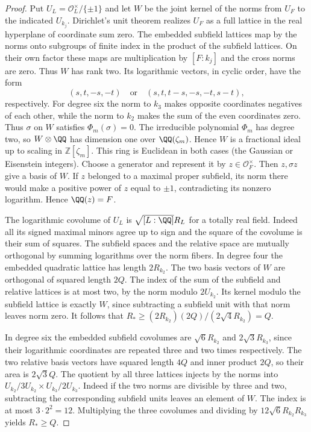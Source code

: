 \documentclass[a4paper,11pt]{article}
\theoremstyle{definition}
\theoremstyle{remark}
\newcommand{\ZZ}{\mathbb Z}\newcommand{\ord}{\operatorname{ord}}
\numberwithin{equation}{section}
\newcommand{\OO}{\mathcal O}
\begin{document}
\begin{proof}
Put \(U_L=\OO_L^\times/\{\pm1\}\) and let \(W\) be the joint
kernel of the norms from \(U_F\) to the indicated \(U_{k_j}\).
Dirichlet's unit theorem realizes \(U_F\) as a full lattice
in the real hyperplane of coordinate sum zero. The embedded
subfield lattices map by the norms onto subgroups of finite
index in the product of the subfield lattices. On their own
factor these maps are multiplication by \([F:k_j]\) and the
cross norms are zero. Thus \(W\) has rank two. Its logarithmic
vectors, in cyclic order, have the form
\[
  (s,t,-s,-t)\quad\text{or}\quad(s,t,t-s,-s,-t,s-t),
\]
respectively. For degree six the norm to \(k_3\) makes opposite
coordinates negatives of each other, while the norm to \(k_2\)
makes the sum of the even coordinates zero. Thus \(\sigma\)
on \(W\) satisfies \(\Phi_m(\sigma)=0\). The irreducible polynomial
\(\Phi_m\) has degree two, so \(W\otimes\QQ\) has dimension one
over \(\QQ(\zeta_m)\). Hence \(W\) is a fractional ideal up to
scaling in \(\ZZ[\zeta_m]\). This ring is Euclidean in both cases
(the Gaussian or Eisenstein integers). Choose a generator and
represent it by \(z\in\OO_F^\times\). Then \(z,\sigma z\) give a
basis of \(W\). If \(z\) belonged to a maximal proper subfield,
its norm there would make a positive power of \(z\) equal to
\(\pm1\), contradicting its nonzero logarithm. Hence \(\QQ(z)=F\).

The logarithmic covolume of \(U_L\) is \(\sqrt{[L:\QQ]}R_L\)
for a totally real field. Indeed all its signed maximal minors
agree up to sign and the square of the covolume is their sum of
squares. The subfield spaces and the relative space are mutually
orthogonal by summing logarithms over the norm fibers. In degree
four the embedded quadratic lattice has length \(2R_{k_2}\).
The two basis vectors of \(W\) are orthogonal of squared length
\(2Q\). The index of the sum of the subfield and relative lattices
is at most two, by the norm modulo \(2U_{k_2}\). Its kernel modulo
the subfield lattice is exactly \(W\), since subtracting a
subfield unit with that norm leaves norm zero. It follows that
\(R_*\ge (2R_{k_2})(2Q)/(2\sqrt4 R_{k_2})=Q\).

In degree six the embedded subfield covolumes are
\(\sqrt6R_{k_2}\) and \(2\sqrt3 R_{k_3}\), since their logarithmic
coordinates are repeated three and two times respectively. The
two relative basis vectors have squared length \(4Q\) and inner
product \(2Q\), so their area is \(2\sqrt3 Q\). The quotient by
all three lattices injects by the norms into
\(U_{k_2}/3U_{k_2}\times U_{k_3}/2U_{k_3}\). Indeed if the two
norms are divisible by three and two, subtracting the corresponding
subfield units leaves an element of \(W\). The index is at most
\(3\cdot2^2=12\). Multiplying the three covolumes and dividing
by \(12\sqrt6R_{k_2}R_{k_3}\) yields \(R_*\ge Q\).


\end{proof}
\end{document}
